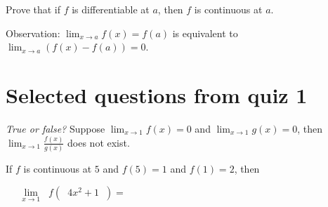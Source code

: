 \documentclass[../main.tex]{subfiles}
\begin{document}
%
%
%

\clearpage

Prove that if \(f\) is differentiable at \(a\), then \(f\) is continuous at \(a\).

Observation: \(\lim_{x \to a} f(x) = f(a)\) is equivalent to \(\lim_{x \to a} (f(x) - f(a)) = 0\).

\clearpage
\section{Selected questions from quiz 1}
\emph{True or false?} Suppose \(\lim_{x \to 1}f(x) = 0\) and \(\lim_{x \to 1}g(x) = 0\), then \(\lim_{x \to 1} \frac{f(x)}{g(x)}\) does not exist.
\vfill


If \(f\) is continuous at \(5\) and \(f(5) = 1\) and \(f(1) = 2\), then 
\vspace{1em}

\[
  \lim_{x \to 1} \phantom{x} f( \phantom{x} 4x^{2} + 1 \phantom{x}) = \phantom{MMMMMMMMMMMMMMMMMMMMMMM}
\]
\vspace{1in}
\end{document}
